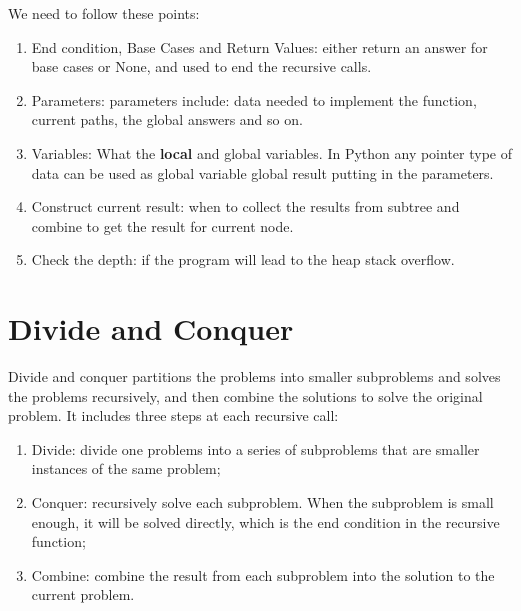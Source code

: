 \documentclass[../algorithms.tex]{subfiles}
\begin{document}
We need to follow these points:
\begin{enumerate}
    \item End condition, Base Cases and Return Values: either return an answer for base cases or None, and used to end the recursive calls.  
    \item Parameters: parameters include: data needed to implement the function, current paths, the global answers and so on. 
    \item Variables: What the \textbf{local} and {global} variables. In Python any pointer type of data can be used as global variable global result putting in the parameters. 
    \item Construct current result: when to collect the results from subtree and combine to get the result for current node.
    \item Check the depth: if the program will lead to the heap stack overflow.
\end{enumerate}


\section{Divide and Conquer}
Divide and conquer partitions the problems into smaller subproblems and solves the problems recursively, and then combine the solutions to solve the original problem. It includes three steps at each recursive call:
\begin{enumerate}
    \item Divide: divide one problems into a series of subproblems that are smaller instances of the same problem;
    \item Conquer: recursively solve each subproblem. When the subproblem is small enough, it will be solved directly, which is the end condition in the recursive function; 
    \item Combine: combine the result from each subproblem into the solution to the current problem.
\end{enumerate}
\end{document}
